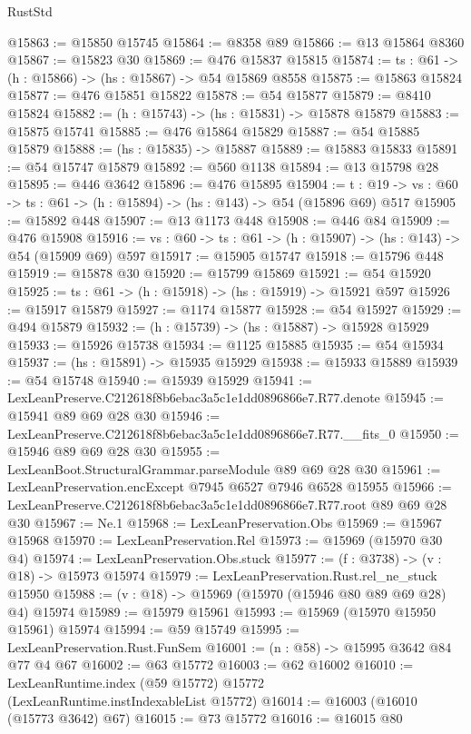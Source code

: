 \begin{lexlean}{RustStd}
\begin{coremodule}
@15863 := @15850 @15745
@15864 := @8358 @89
@15866 := @13 @15864 @8360
@15867 := @15823 @30
@15869 := @476 @15837 @15815
@15874 := {ts : @61} -> (h : @15866) -> (hs : @15867) -> @54 @15869 @8558
@15875 := @15863 @15824
@15877 := @476 @15851 @15822
@15878 := @54 @15877
@15879 := @8410 @15824
@15882 := (h : @15743) -> (hs : @15831) -> @15878 @15879
@15883 := @15875 @15741
@15885 := @476 @15864 @15829
@15887 := @54 @15885 @15879
@15888 := (hs : @15835) -> @15887
@15889 := @15883 @15833
@15891 := @54 @15747 @15879
@15892 := @560 @1138
@15894 := @13 @15798 @28
@15895 := @446 @3642
@15896 := @476 @15895
@15904 := {t : @19} ->
  {vs : @60} -> {ts : @61} -> (h : @15894) -> (hs : @143) -> @54 (@15896 @69) @517
@15905 := @15892 @448
@15907 := @13 @1173 @448
@15908 := @446 @84
@15909 := @476 @15908
@15916 := {vs : @60} -> {ts : @61} -> (h : @15907) -> (hs : @143) -> @54 (@15909 @69) @597
@15917 := @15905 @15747
@15918 := @15796 @448
@15919 := @15878 @30
@15920 := @15799 @15869
@15921 := @54 @15920
@15925 := {ts : @61} -> (h : @15918) -> (hs : @15919) -> @15921 @597
@15926 := @15917 @15879
@15927 := @1174 @15877
@15928 := @54 @15927
@15929 := @494 @15879
@15932 := (h : @15739) -> (hs : @15887) -> @15928 @15929
@15933 := @15926 @15738
@15934 := @1125 @15885
@15935 := @54 @15934
@15937 := (hs : @15891) -> @15935 @15929
@15938 := @15933 @15889
@15939 := @54 @15748
@15940 := @15939 @15929
@15941 := LexLeanPreserve.C212618f8b6ebac3a5c1e1dd0896866e7.R77.denote
@15945 := @15941 @89 @69 @28 @30
@15946 := LexLeanPreserve.C212618f8b6ebac3a5c1e1dd0896866e7.R77.__fits_0
@15950 := @15946 @89 @69 @28 @30
@15955 := LexLeanBoot.StructuralGrammar.parseModule @89 @69 @28 @30
@15961 := LexLeanPreservation.encExcept @7945 @6527 @7946 @6528 @15955
@15966 := LexLeanPreserve.C212618f8b6ebac3a5c1e1dd0896866e7.R77.root @89 @69 @28 @30
@15967 := Ne.{1}
@15968 := LexLeanPreservation.Obs
@15969 := @15967 @15968
@15970 := LexLeanPreservation.Rel
@15973 := @15969 (@15970 @30 @4)
@15974 := LexLeanPreservation.Obs.stuck
@15977 := (f : @3738) -> (v : @18) -> @15973 @15974
@15979 := LexLeanPreservation.Rust.rel_ne_stuck @15950
@15988 := (v : @18) -> @15969 (@15970 (@15946 @80 @89 @69 @28) @4) @15974
@15989 := @15979 @15961
@15993 := @15969 (@15970 @15950 @15961) @15974
@15994 := @59 @15749
@15995 := LexLeanPreservation.Rust.FunSem
@16001 := (n : @58) -> @15995 @3642 @84 @77 @4 @67
@16002 := @63 @15772
@16003 := @62 @16002
@16010 := LexLeanRuntime.index (@59 @15772) @15772 (LexLeanRuntime.instIndexableList @15772)
@16014 := @16003 (@16010 (@15773 @3642) @67)
@16015 := @73 @15772
@16016 := @16015 @80

\end{coremodule}
\end{lexlean}
